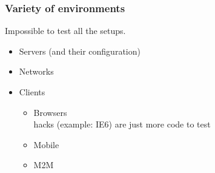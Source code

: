 \begin{frame}
\frametitle{Variety of environments}
\begin{center}
Impossible to test all the setups.
\end{center}
\begin{itemize}
\item Servers \small{(and their configuration)}
\item Networks
\item Clients
	\begin{itemize}
	\item Browsers
		\\ hacks \small{(example: IE6)} are just more code to test
	\item Mobile
	\item M2M
	\end{itemize}
\end{itemize}
\end{frame}

